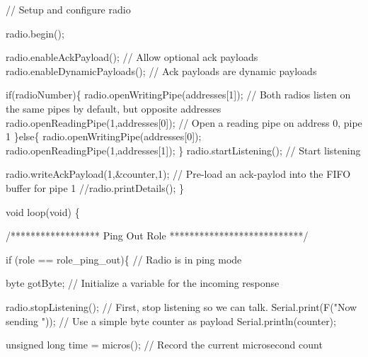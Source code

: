 \begin{DoxyCodeInclude}
  \textcolor{comment}{// Setup and configure radio}

  radio.begin();

  radio.enableAckPayload();                     \textcolor{comment}{// Allow optional ack payloads}
  radio.enableDynamicPayloads();                \textcolor{comment}{// Ack payloads are dynamic payloads}
  
  \textcolor{keywordflow}{if}(radioNumber)\{
    radio.openWritingPipe(addresses[1]);        \textcolor{comment}{// Both radios listen on the same pipes by default, but
       opposite addresses}
    radio.openReadingPipe(1,addresses[0]);      \textcolor{comment}{// Open a reading pipe on address 0, pipe 1}
  \}\textcolor{keywordflow}{else}\{
    radio.openWritingPipe(addresses[0]);
    radio.openReadingPipe(1,addresses[1]);
  \}
  radio.startListening();                       \textcolor{comment}{// Start listening  }
  
  radio.writeAckPayload(1,&counter,1);          \textcolor{comment}{// Pre-load an ack-paylod into the FIFO buffer for pipe 1}
  \textcolor{comment}{//radio.printDetails();}
\}

\textcolor{keywordtype}{void} loop(\textcolor{keywordtype}{void}) \{

  
\textcolor{comment}{/****************** Ping Out Role ***************************/}

  \textcolor{keywordflow}{if} (role == role\_ping\_out)\{                               \textcolor{comment}{// Radio is in ping mode}

    byte gotByte;                                           \textcolor{comment}{// Initialize a variable for the incoming
       response}
    
    radio.stopListening();                                  \textcolor{comment}{// First, stop listening so we can talk.      }
    Serial.print(F(\textcolor{stringliteral}{"Now sending "}));                         \textcolor{comment}{// Use a simple byte counter as payload}
    Serial.println(counter);
    
    \textcolor{keywordtype}{unsigned} \textcolor{keywordtype}{long} time = micros();                          \textcolor{comment}{// Record the current microsecond count   }
                                                            

\end{DoxyCodeInclude}
